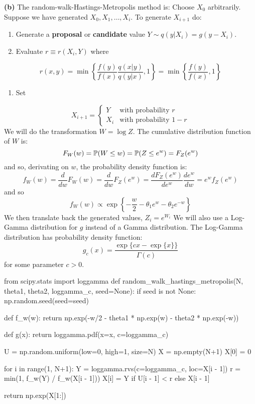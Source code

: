 \textbf{(b)} The random-walk-Hastings-Metropolis method is:
Choose \(X_{0}\) arbitrarily. Suppose we have generated
\(X_{0}, X_{1}, \dots, X_{i}\). To generate \(X_{i+1}\) do:
\begin{enumerate}[tightlist,label={\arabic*.}]
\item
  Generate a \textbf{proposal} or \textbf{candidate} value
  \(Y \sim q(y | X_{i}) = g(y - X_{i})\).
\item
  Evaluate \(r \equiv r(X_{i}, Y)\) where
\end{enumerate}
\[
r(x, y) = \min \left\{ \frac{f(y)}{f(x)} \frac{q(x | y)}{q(y | x)}, 1 \right\} = \min \left\{ \frac{f(y)}{f(x)}, 1 \right\}
\]
\begin{enumerate}[tightlist,label={\arabic*.},resume]
\item
  Set
\end{enumerate}
\[
X_{i+1} = \begin{cases}
Y   &\text{with probability } r \\
X_{i} &\text{with probability } 1 - r 
\end{cases}
\]
We will do the transformation \(W = \log Z\). The cumulative
distribution function of \(W\) is:
\[
F_{W}(w) = \PROB\left( W \leq w \right) = \PROB\left( Z \leq e^{w} \right) = F_Z(e^{w})
\]
and so, derivating on \(w\), the probability density function is:
\[
f_W(w) = \frac{d}{dw} F_{W}(w) = \frac{d}{dw} F_Z(e^{w}) = \frac{d F_Z(e^{w})}{d e^{w}} \frac{d e^{w}}{ dw } = e^{w} f_Z(e^w)
\]
and so
\[
f_W(w) \propto \exp \left\{ -\frac{w}{2}
-\theta_{1} e^{w} - \theta_{2} e^{-w} \right\}
\]
We then translate back the generated values, \(Z_{i} = e^{W_{i}}\) We will
also use a Log-Gamma distribution for \(g\) instead of a Gamma
distribution. The Log-Gamma distribution has probability density
function:
\[
g_c(x) = \frac{\exp \{ cx - \exp \{ x \} \}}{\Gamma(c)}
\]
for some parameter \(c > 0\).

\begin{python}
from scipy.stats import loggamma
def random_walk_hastings_metropolis(N, theta1, theta2, loggamma_c, seed=None):
    if seed is not None:
        np.random.seed(seed=seed)
        
    def f_w(w):
        return np.exp(-w/2 - theta1 * np.exp(w) - theta2 * np.exp(-w))
        
    def g(x):
        return loggamma.pdf(x=x, c=loggamma_c)
    
    U = np.random.uniform(low=0, high=1, size=N)
    X = np.empty(N+1)
    X[0] = 0
    
    for i in range(1, N+1):
        Y = loggamma.rvs(c=loggamma_c, loc=X[i - 1])
        r = min(1, f_w(Y) / f_w(X[i - 1]))
        X[i] = Y if U[i - 1] < r else X[i - 1]
        
    return np.exp(X[1:])
\end{python}

